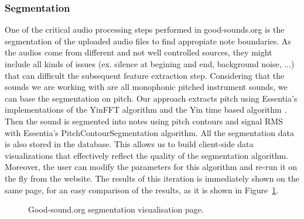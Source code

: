 \documentclass{article}
\begin{document}
\subsubsection{Segmentation}
One of the critical audio processing steps  performed in good-sounds.org is the segmentation of the uploaded audio files to find appropiate note boundaries. As the audios come from different and not well controlled sources, they might include all kinds of issues (ex. silence at begining and end, background noise, ...) that can difficult the subsequent feature extraction step. Considering that the sounds we are working with are all monophonic pitched instrument sounds, we can base the segmentation on pitch. Our approach extracts pitch using Essentia’s \cite{03} implementations of the YinFFT algorithm \cite{04} and the Yin time based algorithm \cite{05}. Then the sound is segmented into notes using pitch contours \cite{06} and signal RMS with Essentia’s PitchContourSegmentation algorithm.  
All the segmentation data is also stored in the database. This allows us to build client-side data visualizations that effectively reflect the quality of the segmentation algorithm. Moreover, the user can modify the parameters for this algorithm and re-run it on the fly from the website. The results of this iteration is immediately shown on the same page, for an easy comparison of the results, as it is shown in Figure~\ref{fig:segmentation}.

\begin{figure}[ht]
 \centerline{}
 \caption{Good-sound.org segmentation visualisation page.}
 \label{fig:segmentation}
\end{figure}
\end{document}

